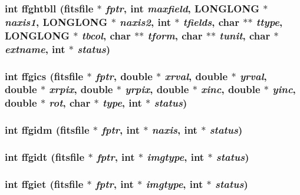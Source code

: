 \subsubsection{\setlength{\rightskip}{0pt plus 5cm}int ffghtbll (\bf{fitsfile} $\ast$ {\em fptr}, int {\em maxfield}, \bf{LONGLONG} $\ast$ {\em naxis1}, \bf{LONGLONG} $\ast$ {\em naxis2}, int $\ast$ {\em tfields}, char $\ast$$\ast$ {\em ttype}, \bf{LONGLONG} $\ast$ {\em tbcol}, char $\ast$$\ast$ {\em tform}, char $\ast$$\ast$ {\em tunit}, char $\ast$ {\em extname}, int $\ast$ {\em status})}\label{src_2fitsio_8h_62e73d788b8463ca174a441efd62c055}


\subsubsection{\setlength{\rightskip}{0pt plus 5cm}int ffgics (\bf{fitsfile} $\ast$ {\em fptr}, double $\ast$ {\em xrval}, double $\ast$ {\em yrval}, double $\ast$ {\em xrpix}, double $\ast$ {\em yrpix}, double $\ast$ {\em xinc}, double $\ast$ {\em yinc}, double $\ast$ {\em rot}, char $\ast$ {\em type}, int $\ast$ {\em status})}\label{src_2fitsio_8h_e41ae6ec4d4f1df61ce26ecc9d558fcb}


\subsubsection{\setlength{\rightskip}{0pt plus 5cm}int ffgidm (\bf{fitsfile} $\ast$ {\em fptr}, int $\ast$ {\em naxis}, int $\ast$ {\em status})}\label{src_2fitsio_8h_2faefcdb1176d17c8159464da5f4fe3f}


\subsubsection{\setlength{\rightskip}{0pt plus 5cm}int ffgidt (\bf{fitsfile} $\ast$ {\em fptr}, int $\ast$ {\em imgtype}, int $\ast$ {\em status})}\label{src_2fitsio_8h_3a8c6b776e15fb6a1ced2ac459366825}


\subsubsection{\setlength{\rightskip}{0pt plus 5cm}int ffgiet (\bf{fitsfile} $\ast$ {\em fptr}, int $\ast$ {\em imgtype}, int $\ast$ {\em status})}\label{src_2fitsio_8h_d26898d66d9521c703b32f967a7ec68c}


